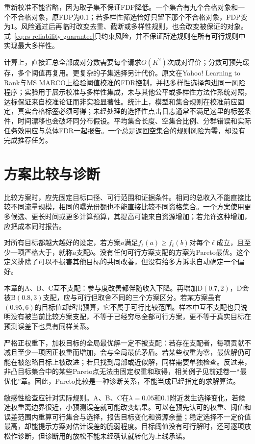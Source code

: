 重新校准不能省略，因为取子集不保证FDP降低。一个集合有九个合格对象和一个不合格对象，原FDP为0.1；若多样性筛选恰好只留下那个不合格对象，FDP变为1。风险通过后再临时改变去重、截断或多样性规则，也会改变被保证的对象。式~\eqref{eq:rs-reliability-guarantee}只约束风险，并不保证所选规则在所有可行规则中实现最大多样性。

计算上，直接汇总全部成对分数需要每个请求$O(K^2)$次成对评价；分数可预先缓存，多个阈值再复用。更复杂的子集选择另计代价。原文在Yahoo! Learning to Rank与MS MARCO上检验阈值校准的FDR控制，并把多样性选择包进同一风险程序；实验用于展示校准与多样性集成，未与其他公平或多样性方法作系统对照，达标保证来自校准论证而非实验显著性。统计上，模型和集合规则在校准前应固定，真实合格标签必须可得；未经处理的选择性点击日志通常不满足这里的标签条件，时间漂移也会破坏同分布假设。平均集合长度、空集合比例、分群错误和实际任务效用应与总体FDR一起报告。一个总是返回空集合的规则风险为零，却没有完成推荐任务。

\section{方案比较与诊断}
\label{sec:rs-decision-diagnostics}

比较方案时，应先固定目标口径、可行范围和证据条件。相同的总收入不能直接比较不同流量规模，相同的曝光份额也不能直接比较不同资格集合。一个方案使用更多候选、更长时间或更多计算预算，其提高可能来自资源增加；若允许这种增加，应把成本同时报告。

对所有目标都越大越好的设定，若方案$a$满足$f_\ell(a)\geq f_\ell(b)$对每个$\ell$成立，且至少一项严格大于，就称$a$支配$b$。没有任何可行方案支配的方案为Pareto最优。这个定义排除了可以不损害其他目标的共同改善，但没有给多方诉求自动确定一个偏好。

本章的A、B、C互不支配：参与度改善都伴随收入下降。再增加D$(0.7,2)$，D会被B$(0.8,3)$支配，应与可行但取舍不同的三个方案区分。若某方案虽有$(0.95,6)$的目标值却超出预算，它不属于可行比较范围。样本中互不支配也只说明没有被当前比较方案支配，不等于已经穷尽全部可行方案，更不等于真实目标在预测误差下也具有同样关系。

严格正权重下，加权目标的全局最优解一定不被支配：若存在支配者，每项贡献不减且至少一项因正权重而增加，会与全局最优矛盾。若某些权重为零，最优解仍可能在被忽略目标上被改进；若只找到局部或近似解，同样需要单独检查。反过来，非凸目标集合中的某些Pareto点无法由固定权重和取得，相关例子见前述卷一“最优化”章。因此，Pareto比较是一种诊断关系，不能当成已经指定的求解算法。

敏感性检查应针对实际规则。A、B、C在$\lambda=0.05$和0.1附近发生选择变化，若候选权重离边界很近，小预测误差就可能改变结果。可以在预先认可的权重、阈值和误差范围内重算可行集合与选择，报告目标变化和资源余量；稳定选择不一定价值最高，却能提示方案对估计误差的脆弱程度。目标阈值没有可行解时，还可逐项放松作诊断，但诊断用的放松不能未经确认就转化为上线承诺。

